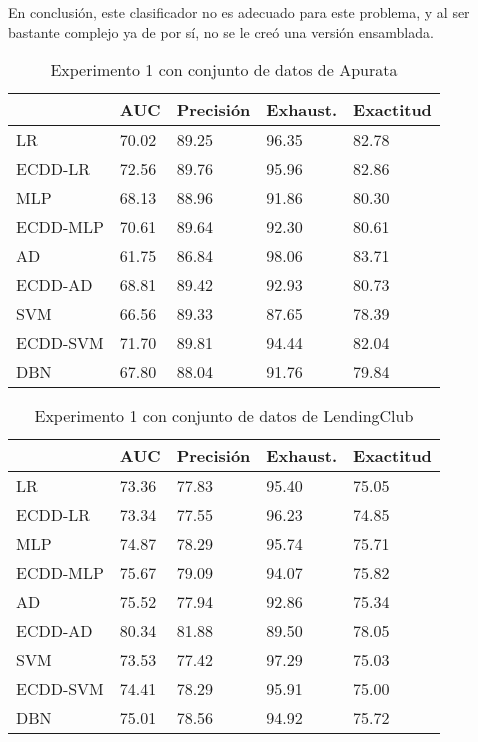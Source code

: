 En conclusión, este clasificador no es adecuado para este problema, y al ser bastante complejo ya de por sí, no se le creó una versión ensamblada.


\begin{table}[]
\centering
\caption{Experimento 1 con conjunto de datos de Apurata}
\label{tab:apurata-proc1}
\begin{tabularx}{0.75\textwidth}{|l|Y Y Y Y|}
				\hline
				& AUC		& Precisión	& Exhaust.		& Exactitud	\\
				\hline
LR				& 70.02		& 89.25		& 96.35			& 82.78		\\		%
ECDD-LR			& 72.56		& 89.76		& 95.96			& 82.86		\\		%
				\hline
MLP				& 68.13		& 88.96		& 91.86			& 80.30		\\		%
ECDD-MLP		& 70.61		& 89.64		& 92.30			& 80.61		\\		%
				\hline
AD				& 61.75		& 86.84		& 98.06			& 83.71		\\		%
ECDD-AD			& 68.81		& 89.42		& 92.93			& 80.73		\\		%
				\hline
SVM				& 66.56		& 89.33		& 87.65			& 78.39		\\		%
ECDD-SVM		& 71.70		& 89.81		& 94.44			& 82.04		\\		%
				\hline
DBN				& 67.80		& 88.04		& 91.76			& 79.84		\\		%
				\hline
\end{tabularx}
\end{table}


\begin{table}[]
\centering
\caption{Experimento 1 con conjunto de datos de LendingClub}
\label{tab:lc-proc1}
\begin{tabularx}{0.75\textwidth}{|l|Y Y Y Y|}
				\hline
				& AUC		& Precisión	& Exhaust.		& Exactitud	\\
				\hline
LR				& 73.36		& 77.83		& 95.40			& 75.05		\\		%
ECDD-LR			& 73.34		& 77.55		& 96.23			& 74.85		\\		%
				\hline
MLP				& 74.87		& 78.29		& 95.74			& 75.71		\\		%
ECDD-MLP		& 75.67		& 79.09		& 94.07			& 75.82		\\		%
				\hline
AD				& 75.52		& 77.94		& 92.86			& 75.34		\\		%
ECDD-AD			& 80.34		& 81.88		& 89.50			& 78.05		\\		%
				\hline
SVM				& 73.53		& 77.42		& 97.29			& 75.03		\\		%
ECDD-SVM		& 74.41		& 78.29		& 95.91			& 75.00		\\		%
				\hline
DBN				& 75.01		& 78.56		& 94.92			& 75.72		\\		%
				\hline
\end{tabularx}
\end{table}


